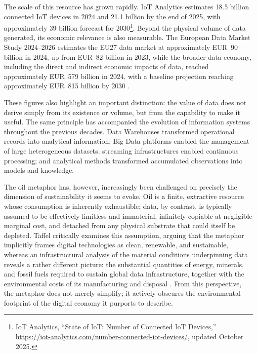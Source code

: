 The scale of this resource has grown rapidly. IoT Analytics estimates 18.5 billion connected IoT devices in 2024 and 21.1 billion by the end of 2025, with approximately 39 billion forecast for 2030\footnote{IoT Analytics, ``State of IoT: Number of Connected IoT Devices,'' \url{https://iot-analytics.com/number-connected-iot-devices/}, updated October 2025.}. Beyond the physical volume of data generated, its economic relevance is also measurable. The European Data Market Study 2024--2026 estimates the EU27 data market at approximately EUR~90 billion in 2024, up from EUR~82 billion in 2023, while the broader data economy, including the direct and indirect economic impacts of data, reached approximately EUR~579 billion in 2024, with a baseline projection reaching approximately EUR~815 billion by 2030 \cite{eudatamarket2024}.

These figures also highlight an important distinction: the value of data does not derive simply from its existence or volume, but from the capability to make it useful. The same principle has accompanied the evolution of information systems throughout the previous decades. Data Warehouses transformed operational records into analytical information; Big Data platforms enabled the management of large heterogeneous datasets; streaming infrastructures enabled continuous processing; and analytical methods transformed accumulated observations into models and knowledge.

The oil metaphor has, however, increasingly been challenged on precisely the dimension of sustainability it seems to evoke. Oil is a finite, extractive resource whose consumption is inherently exhaustible; data, by contrast, is typically assumed to be effectively limitless and immaterial, infinitely copiable at negligible marginal cost, and detached from any physical substrate that could itself be depleted. Taffel critically examines this assumption, arguing that the metaphor implicitly frames digital technologies as clean, renewable, and sustainable, whereas an infrastructural analysis of the material conditions underpinning data reveals a rather different picture: the substantial quantities of energy, minerals, and fossil fuels required to sustain global data infrastructure, together with the environmental costs of its manufacturing and disposal \cite{taffel2021}. From this perspective, the metaphor does not merely simplify; it actively obscures the environmental footprint of the digital economy it purports to describe.

